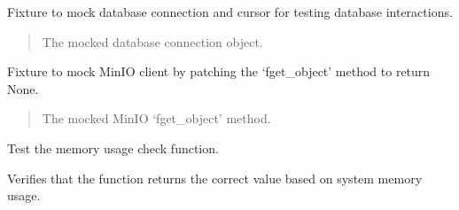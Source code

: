 \documentclass[letterpaper,10pt,english]{sphinxmanual}
\begin{document}
\begin{fulllineitems}
\label{\detokenize{test.data_storage:test.data_storage.test_paragraph_extraction.mock_db}}
\pysigstartsignatures
\pysiglinewithargsret
{}
{}
{}
\pysigstopsignatures
\sphinxAtStartPar
Fixture to mock database connection and cursor for testing database interactions.
\begin{quote}\begin{description}
\sphinxAtStartPar
{} \textendash{} The mocked database connection object.

\end{description}\end{quote}

\end{fulllineitems}


\begin{fulllineitems}
\label{\detokenize{test.data_storage:test.data_storage.test_paragraph_extraction.mock_minio}}
\pysigstartsignatures
\pysiglinewithargsret
{}
{}
{}
\pysigstopsignatures
\sphinxAtStartPar
Fixture to mock MinIO client by patching the ‘fget\_object’ method to return None.
\begin{quote}\begin{description}
\sphinxAtStartPar
{} \textendash{} The mocked MinIO ‘fget\_object’ method.

\end{description}\end{quote}

\end{fulllineitems}


\begin{fulllineitems}
\label{\detokenize{test.data_storage:test.data_storage.test_paragraph_extraction.test_check_memory_usage}}
\pysigstartsignatures
\pysiglinewithargsret
{}
{}
{}
\pysigstopsignatures
\sphinxAtStartPar
Test the memory usage check function.

\sphinxAtStartPar
Verifies that the function returns the correct value based on system memory usage.

\end{fulllineitems}
\end{document}
